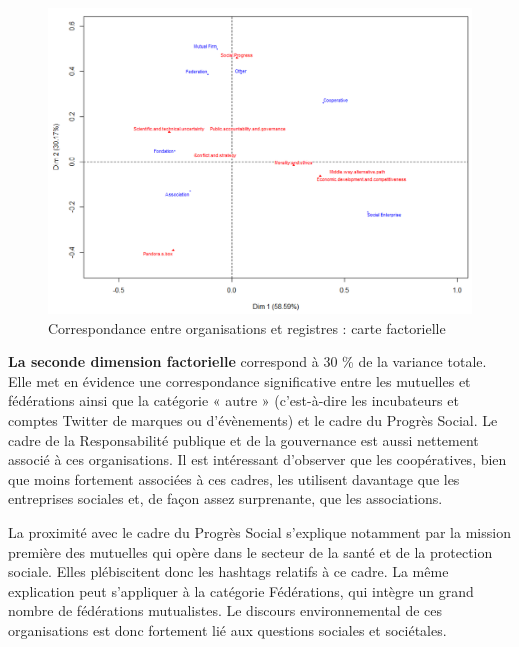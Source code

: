             \begin{landscape}
            \begin{figure}
                \caption{Correspondance entre organisations et registres : carte factorielle}
                \label{figure:7AFC}
                \centering
                \includegraphics[height = 0.90\textheight]{fig/fig7.png}
            \end{figure}
            \end{landscape}


            \textbf{La seconde dimension factorielle} correspond à 30 \% de la variance totale. Elle met en évidence une correspondance significative entre les mutuelles et fédérations ainsi que la catégorie « autre » (c’est-à-dire les incubateurs et comptes Twitter de marques ou d’évènements) et le cadre du Progrès Social. Le cadre de la Responsabilité publique et de la gouvernance est aussi nettement associé à ces organisations. Il est intéressant d’observer que les coopératives, bien que moins fortement associées à ces cadres, les utilisent davantage que les entreprises sociales et, de façon assez surprenante, que les associations.

            La proximité avec le cadre du Progrès Social s’explique notamment par la mission première des mutuelles qui opère dans le secteur de la santé et de la protection sociale. Elles plébiscitent donc les hashtags relatifs à ce cadre. La même explication peut s’appliquer à la catégorie Fédérations, qui intègre un grand nombre de fédérations mutualistes. Le discours environnemental de ces organisations est donc fortement lié aux questions sociales et sociétales. \\

